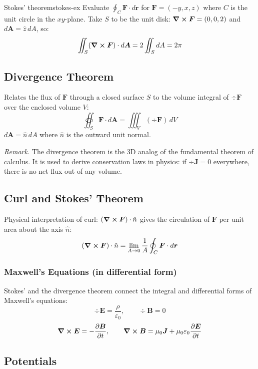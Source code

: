 \documentclass[11pt, letterpaper]{article}
\theoremstyle{plain}
\newenvironment{remark}{\smallskip\noindent\textit{Remark.}}{\smallskip}
\newcommand{\vv}[1]{\bm{#1}}
\begin{document}
\begin{example}{Stokes' theorem}{stokes-ex}
    Evaluate $\oint_C \vv{F}\cdot d\vv{r}$ for $\vv{F} = (-y,x,z)$ where
    $C$ is the unit circle in the $xy$-plane. Take $S$ to be the unit disk:
    $\curl\vv{F} = (0,0,2)$ and $d\vv{A} = \hat{z}\,dA$, so:
    \[
        \iint_S (\curl\vv{F})\cdot d\vv{A} = 2\iint_S dA = 2\pi
    \]
\end{example}


\subsection{Divergence Theorem}

Relates the flux of $\vv{F}$ through a closed surface $S$ to the volume
integral of $\div\vv{F}$ over the enclosed volume $V$:
\[
    \oiint_S \vv{F}\cdot d\vv{A} = \iiint_V (\div\vv{F})\,dV
\]
$d\vv{A} = \hat{n}\,dA$ where $\hat{n}$ is the outward unit normal.

\begin{remark}
    The divergence theorem is the 3D analog of the fundamental theorem of
    calculus. It is used to derive conservation laws in physics:
    if $\div\vv{J} = 0$ everywhere, there is no net flux out of any volume.
\end{remark}


\subsection{Curl and Stokes' Theorem}

Physical interpretation of curl: $(\curl\vv{F})\cdot\hat{n}$ gives the
circulation of $\vv{F}$ per unit area about the axis $\hat{n}$:
\[
    (\curl\vv{F})\cdot\hat{n} = \lim_{A\to 0}
    \frac{1}{A}\oint_C \vv{F}\cdot d\vv{r}
\]

\subsubsection*{Maxwell's Equations (in differential form)}
Stokes' and the divergence theorem connect the integral and differential
forms of Maxwell's equations:
\[
    \div\vv{E} = \frac{\rho}{\varepsilon_0}, \qquad
    \div\vv{B} = 0
\]
\[
    \curl\vv{E} = -\pdv{\vv{B}}{t}, \qquad
    \curl\vv{B} = \mu_0\vv{J} + \mu_0\varepsilon_0\pdv{\vv{E}}{t}
\]


\subsection{Potentials}
\end{document}
